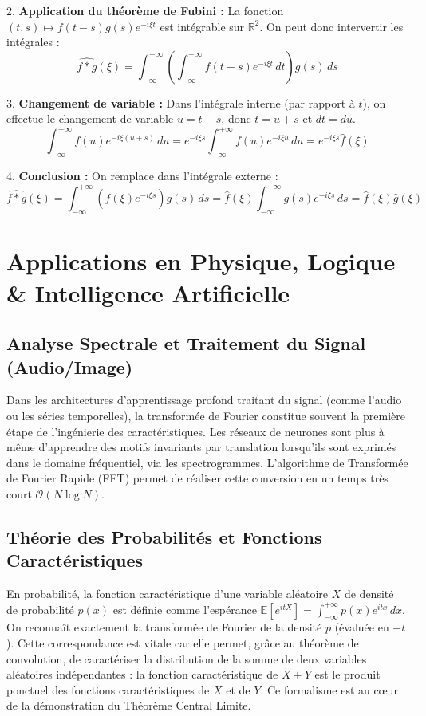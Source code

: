 \documentclass[11pt,a4paper]{article}
\begin{document}
2. \textbf{Application du théorème de Fubini :}
   La fonction $(t, s) \mapsto f(t-s)g(s)e^{-i\xi t}$ est intégrable sur $\mathbb{R}^2$. On peut donc intervertir les intégrales :
   $$ \widehat{f * g}(\xi) = \int_{-\infty}^{+\infty} \left( \int_{-\infty}^{+\infty} f(t-s) e^{-i\xi t} \, dt \right) g(s) \, ds $$

3. \textbf{Changement de variable :}
   Dans l'intégrale interne (par rapport à $t$), on effectue le changement de variable $u = t - s$, donc $t = u + s$ et $dt = du$.
   $$ \int_{-\infty}^{+\infty} f(u) e^{-i\xi (u+s)} \, du = e^{-i\xi s} \int_{-\infty}^{+\infty} f(u) e^{-i\xi u} \, du = e^{-i\xi s} \hat{f}(\xi) $$

4. \textbf{Conclusion :}
   On remplace dans l'intégrale externe :
   $$ \widehat{f * g}(\xi) = \int_{-\infty}^{+\infty} \left( \hat{f}(\xi) e^{-i\xi s} \right) g(s) \, ds = \hat{f}(\xi) \int_{-\infty}^{+\infty} g(s) e^{-i\xi s} \, ds = \hat{f}(\xi) \hat{g}(\xi) $$

\section{Applications en Physique, Logique \& Intelligence Artificielle}

\subsection{Analyse Spectrale et Traitement du Signal (Audio/Image)}

Dans les architectures d'apprentissage profond traitant du signal (comme l'audio ou les séries temporelles), la transformée de Fourier constitue souvent la première étape de l'ingénierie des caractéristiques. Les réseaux de neurones sont plus à même d'apprendre des motifs invariants par translation lorsqu'ils sont exprimés dans le domaine fréquentiel, via les spectrogrammes. L'algorithme de Transformée de Fourier Rapide (FFT) permet de réaliser cette conversion en un temps très court $\mathcal{O}(N \log N)$.

\subsection{Théorie des Probabilités et Fonctions Caractéristiques}

En probabilité, la fonction caractéristique d'une variable aléatoire $X$ de densité de probabilité $p(x)$ est définie comme l'espérance $\mathbb{E}[e^{itX}] = \int_{-\infty}^{+\infty} p(x) e^{itx} \, dx$.
On reconnaît exactement la transformée de Fourier de la densité $p$ (évaluée en $-t$). Cette correspondance est vitale car elle permet, grâce au théorème de convolution, de caractériser la distribution de la somme de deux variables aléatoires indépendantes : la fonction caractéristique de $X+Y$ est le produit ponctuel des fonctions caractéristiques de $X$ et de $Y$. Ce formalisme est au cœur de la démonstration du Théorème Central Limite.
\end{document}

